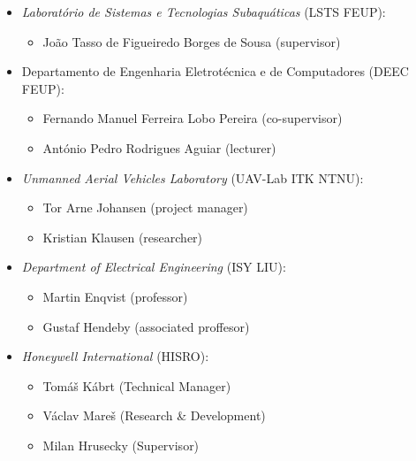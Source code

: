 \begin{itemize}
    \item \emph{Laboratório de Sistemas e Tecnologias Subaquáticas} (LSTS FEUP):
    \begin{itemize}
        \item João Tasso de Figueiredo Borges de Sousa (supervisor)
    \end{itemize}
    
    \item Departamento de Engenharia Eletrotécnica e de Computadores (DEEC FEUP):
    \begin{itemize}
        \item Fernando Manuel Ferreira Lobo Pereira (co-supervisor)
        \item António Pedro Rodrigues Aguiar (lecturer)
    \end{itemize}
    
    \item \emph{Unmanned Aerial Vehicles Laboratory} (UAV-Lab ITK NTNU):
    \begin{itemize}
        \item Tor Arne Johansen (project manager)
        \item Kristian Klausen (researcher)
    \end{itemize}
    
    \item \emph{Department of Electrical Engineering} (ISY LIU):
    \begin{itemize}
        \item Martin Enqvist (professor)
        \item Gustaf Hendeby (associated proffesor)
    \end{itemize}
    
    \item \emph{Honeywell International} (HISRO):
    \begin{itemize}
        \item Tomáš Kábrt (Technical Manager)
        \item Václav Mareš (Research \& Development)
        \item Milan Hrusecky (Supervisor)
    \end{itemize}
\end{itemize}
